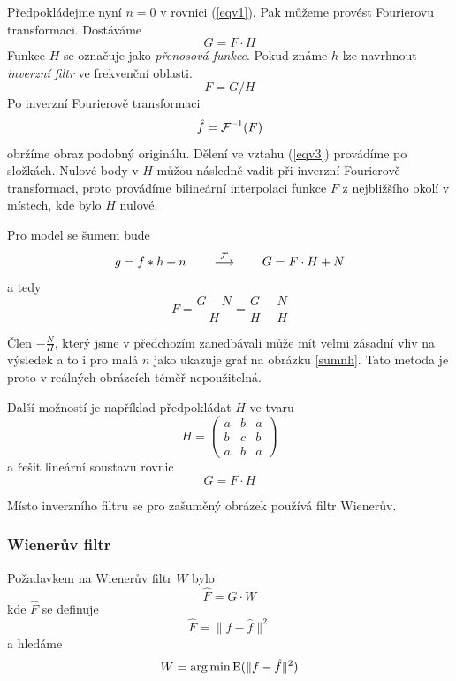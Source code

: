 Předpokládejme nyní $n=0$ v rovnici (\ref{eqv1}). Pak můžeme provést Fourierovu transformaci. Dostáváme
\begin{equation}
G = F\cdot H \label{eqv2}
\end{equation}
Funkce $H$ se označuje jako \emph{přenosová funkce}. Pokud známe $h$ lze navrhnout \emph{inverzní filtr} ve frekvenční oblasti.
\begin{equation}
F = G/H\label{eqv3}
\end{equation}
Po inverzní Fourierově transformaci
\begin{equation}
\hat{f} = \operatorname{\mathcal{F}^{\, --1}}(F)
\end{equation}
obržíme obraz podobný originálu. Dělení ve vztahu (\ref{eqv3}) provádíme po složkách. Nulové body v $H$ můžou následně vadit při inverzní Fourierově transformaci, proto provádíme bilineární interpolaci funkce $F$ z nejbližšího okolí v místech, kde bylo $H$ nulové.



Pro model se šumem bude
\begin{equation}
g = f \ast h+n\label{eqv4} \qquad \stackrel{\operatorname{\mathcal{F}}}{\longrightarrow} \qquad G = F\cdot H+N
\end{equation}
a tedy 
\begin{equation}
F = \frac{G-N}{H}=\frac{G}{H}-\frac{N}{H}\label{eqv6}
\end{equation}

Člen $-\frac{N}{H}$, který jsme v předchozím zanedbávali může mít velmi zásadní vliv na výsledek a to i pro malá $n$ jako
ukazuje graf na obrázku \ref{sumnh}. Tato metoda je proto v reálných obrázcích téměř nepoužitelná.

Další možností je například předpokládat $H$ ve tvaru 
\begin{equation}
H = \left(\begin{array}{ccc}a&b&a\\b&c&b\\a&b&a\end{array}\right)
\end{equation}
a řešit lineární soustavu rovnic
\begin{equation}
G = F\cdot H
\end{equation}

Místo inverzního filtru se pro zašuměný obrázek používá filtr Wienerův.

\subsubsection{Wienerův filtr}
Požadavkem na Wienerův filtr $W$ bylo 
\begin{equation}
\hat{F}=G\cdot W
\end{equation}
kde $\hat{F}$ se definuje
\begin{equation}
\hat{F}=\|f-\hat{f}\|^2
\end{equation}
a hledáme
\begin{equation}
W=\arg \min \operatorname{E} (\|f-\hat{f}\|^2)\label{minimalizace}
\end{equation}

